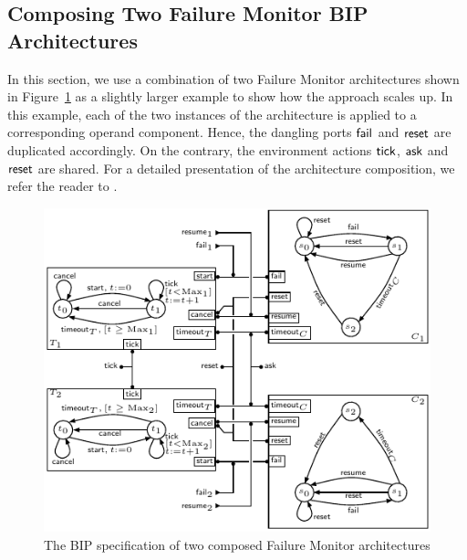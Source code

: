 \documentclass[smallcondensed]{svjour3}
\begin{document}
\subsection{Composing Two Failure Monitor BIP Architectures}
\label{section:use-case:Double}

In this section, we use a combination of two Failure Monitor
architectures shown in Figure~\ref{schema:ArchFailure:BIP:Double}
as a slightly larger example to show how the approach scales up.  In
this example, each of the two instances of the architecture is applied
to a corresponding operand component.  Hence, the dangling ports
$\mathsf{fail}_{}$ and $\mathsf{reset}$ are duplicated accordingly.  On the
contrary, the environment actions $\mathsf{tick}$, $\mathsf{ask}$ and
$\mathsf{reset}$ are shared.  For a detailed presentation of the
architecture composition, we refer the reader to
\cite{AttieBBJS16-architectures-faoc}.

\begin{figure}[ht]
  \centering
  \includegraphics[width=0.9\columnwidth]{ActaXFIG/BIPspec-DoubleArchFailureTimer-v2-2}
  \caption{The BIP specification of two composed Failure Monitor architectures}
  \label{schema:ArchFailure:BIP:Double}
\end{figure}
\end{document}
